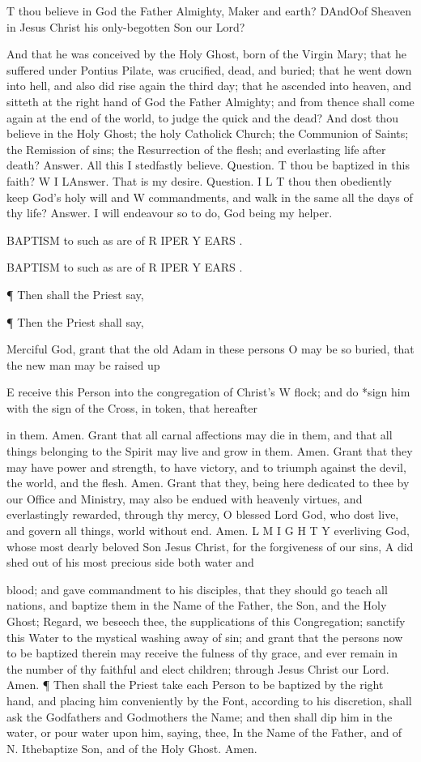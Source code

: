 T thou believe in God the Father Almighty, Maker and earth? DAndOof Sheaven in Jesus Christ his only-begotten Son our Lord?

And that he was conceived by the Holy Ghost, born of the Virgin Mary; that he suffered under Pontius Pilate, was crucified, dead, and buried; that he went down into hell, and also did rise again the third day; that he ascended into heaven, and sitteth at the right hand of God the Father Almighty; and from thence shall come again at the end of the world, to judge the quick and the dead? And dost thou believe in the Holy Ghost; the holy Catholick Church; the Communion of Saints; the Remission of sins; the Resurrection of the flesh; and everlasting life after death? Answer. All this I stedfastly believe. Question. T thou be baptized in this faith? W I LAnswer. That is my desire. Question. I L T thou then obediently keep God's holy will and W commandments, and walk in the same all the days of thy life? Answer. I will endeavour so to do, God being my helper.

BAPTISM to such as are of R IPER Y EARS .

BAPTISM to such as are of R IPER Y EARS .

¶ Then shall the Priest say,

¶ Then the Priest shall say,

Merciful God, grant that the old Adam in these persons O may be so buried, that the new man may be raised up

E receive this Person into the congregation of Christ’s W flock; and do *sign him with the sign of the Cross, in token, that hereafter

in them. Amen. Grant that all carnal affections may die in them, and that all things belonging to the Spirit may live and grow in them. Amen. Grant that they may have power and strength, to have victory, and to triumph against the devil, the world, and the flesh. Amen. Grant that they, being here dedicated to thee by our Office and Ministry, may also be endued with heavenly virtues, and everlastingly rewarded, through thy mercy, O blessed Lord God, who dost live, and govern all things, world without end. Amen. L M I G H T Y everliving God, whose most dearly beloved Son Jesus Christ, for the forgiveness of our sins, A did shed out of his most precious side both water and

blood; and gave commandment to his disciples, that they should go teach all nations, and baptize them in the Name of the Father, the Son, and the Holy Ghost; Regard, we beseech thee, the supplications of this Congregation; sanctify this Water to the mystical washing away of sin; and grant that the persons now to be baptized therein may receive the fulness of thy grace, and ever remain in the number of thy faithful and elect children; through Jesus Christ our Lord. Amen. ¶ Then shall the Priest take each Person to be baptized by the right hand, and placing him conveniently by the Font, according to his discretion, shall ask the Godfathers and Godmothers the Name; and then shall dip him in the water, or pour water upon him, saying, thee, In the Name of the Father, and of N. Ithebaptize Son, and of the Holy Ghost. Amen.

